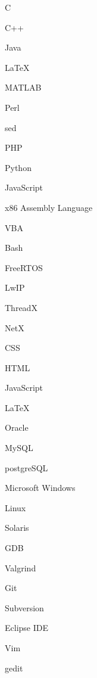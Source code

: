 \documentclass[10pt]{article}
\begin{document}
\begin{technicalSkills}

{\item C
\item C++
\item Java
\item \LaTeX
\item MATLAB
\item Perl
\item sed
\item PHP
\item Python
\item JavaScript
\item x86 Assembly Language
\item VBA}

{\item Bash}

{\item FreeRTOS
\item LwIP
\item ThreadX
\item NetX}

{\item CSS
\item HTML
\item JavaScript}

{\item \LaTeX}

{\item Oracle
\item MySQL
\item postgreSQL}

{\item Microsoft Windows
\item Linux
\item Solaris}

{\item GDB
\item Valgrind}

{\item Git
\item Subversion
\item Eclipse IDE
\item Vim
\item gedit}

\end{technicalSkills}
\end{document}
